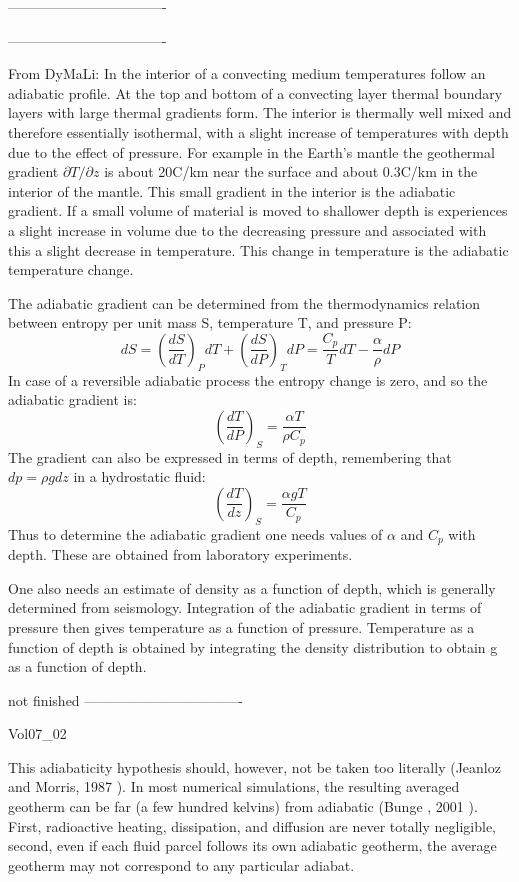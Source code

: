 ----------------------------------


----------------------------------

From DyMaLi: In the interior of a convecting medium temperatures follow an adiabatic profile. 
At the top and bottom of a convecting layer thermal boundary layers with large thermal gradients form. 
The interior is thermally well mixed and therefore essentially isothermal, with a slight increase 
of temperatures with depth due to the effect of pressure.
For example in the Earth's mantle the geothermal gradient $\partial T /\partial z$ 
is about 20C/km near the 
surface and about 0.3C/km in the interior of the mantle. This small gradient in the 
interior is the adiabatic gradient. If a small
volume of material is moved to shallower depth is experiences a slight increase in volume 
due to the decreasing pressure and associated with this a slight decrease in temperature. 
This change in temperature is the adiabatic temperature change.

The adiabatic gradient can be determined from the thermodynamics relation between entropy per unit mass S,
temperature T, and pressure P:
\[
dS = \left( \frac{dS}{dT}\right)_P dT +  \left( \frac{dS}{dP}\right)_T dP
=
\frac{C_p }{T} dT - \frac{\alpha}{\rho} dP
\]
In case of a reversible adiabatic process the entropy change is zero, and so the adiabatic gradient is:
\[
\left( \frac{dT}{dP}\right)_S = \frac{\alpha T}{\rho C_p} 
\]
The gradient can also be expressed in terms of depth, remembering that $d p = \rho gdz$ 
in a hydrostatic fluid:
\[
\left( \frac{dT}{dz}\right)_S = \frac{\alpha g T}{C_p} 
\]
Thus to determine the adiabatic gradient one needs values of $\alpha$ 
and $C_p$ with depth. These are obtained from laboratory experiments.

One also needs an estimate of density as a function of depth, which is generally determined
from seismology. 
Integration of the adiabatic gradient in terms of pressure then gives
temperature as a function of pressure. 
Temperature as a function of depth is obtained by integrating the density
distribution to obtain g as a function of depth.

not finished
----------------------------------

Vol07\_02

This adiabaticity hypothesis should, however, not
be taken too literally (Jeanloz and Morris, 1987 \cite{jemo87}). In
most numerical simulations, the resulting averaged
geotherm can be far (a few hundred kelvins) from
adiabatic (Bunge \etal, 2001 \cite{burm01}). First, radioactive 
heating, dissipation, and diffusion are never totally
negligible, second, even if each fluid parcel follows
its own adiabatic geotherm, the average geotherm
may not correspond to any particular adiabat.



